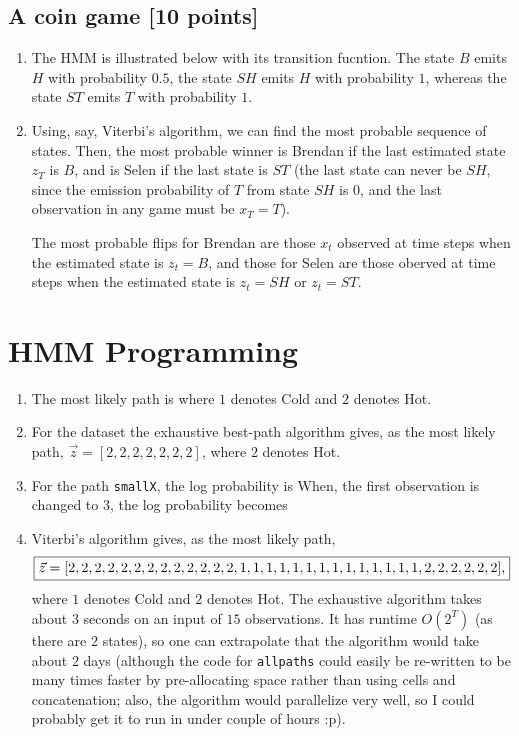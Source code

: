 \documentclass[11pt]{article}
\begin{document}
\subsection{A coin game [10 points]}
\begin{enumerate}[1.]
\item The HMM is illustrated below with its transition fucntion. The state $B$
emits $H$ with probability $0.5$, the state $SH$ emits $H$ with probability
$1$, whereas the state $ST$ emits $T$ with probability $1$.
\vspace{2in}

\item Using, say, Viterbi's algorithm, we can find the most probable sequence
of states. Then, the most probable winner is Brendan if the last estimated
state $z_T$ is $B$, and is Selen if the last state is $ST$ (the last state can
never be $SH$, since the emission probability of $T$ from state $SH$ is $0$,
and the last observation in any game must be $x_T = T$).

The most probable
flips for Brendan are those $x_t$ observed at time steps when the estimated
state is $z_t = B$, and those for Selen are those oberved at time steps when
the estimated state is $z_t = SH$ or $z_t = ST$.
\end{enumerate}

\section{HMM Programming}
\begin{enumerate}
\item The most likely path is  where
$1$ denotes Cold and $2$ denotes Hot. 

\item For the dataset  the exhaustive
best-path algorithm gives, as the most likely path,
$\vec{z} = [2, 2, 2, 2, 2, 2, 2]$, where $2$ denotes Hot.

\item For the path \texttt{smallX}, the log probability is 
When, the first observation is changed to $3$, the log probability becomes

\item Viterbi's algorithm gives, as the most likely path,
\[\mbox{\fbox{$\vec{z}
 = [2,2,2,2,2,2,2,2,2,2,2,2,2,1,1,1,1,1,1,1,1,1,1,1,1,1,1,2,2,2,2,2,2]$,}}
\]
where $1$ denotes Cold and $2$ denotes Hot. The exhaustive algorithm takes
about $3$ seconds on an input of $15$ observations. It has runtime $O(2^T)$
(as there are $2$ states), so one can extrapolate that the algorithm would
take about $2$ days (although the code for \texttt{allpaths} could easily be
re-written to be many times faster by pre-allocating space rather than
using cells and concatenation; also, the algorithm would parallelize very
well, so I could probably get it to run in under couple of hours :p).
\end{enumerate}
\end{document}
